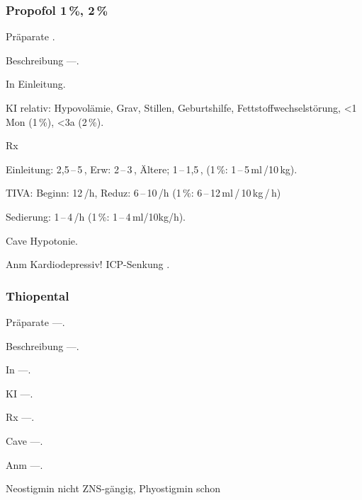 \subsubsection{Propofol 1\,\%, 2\,\%}

\begin{labeling}[:]{mm}
  \item[Präparate]  .
  \item[Beschreibung] ---.
  \item[In] Einleitung.
  \item[KI] relativ: Hypovolämie, Grav, Stillen, Geburtshilfe,
  Fettstoffwechselstörung, {\textless}1 Mon (1\,\%), {\textless}3a (2\,\%).
  \item[Rx]
  \begin{inparaitem}
  \item Einleitung: 2,5\,--\,5\,, Erw:
  2\,--\,3\,, Ältere; 1\,--\,1,5\,, (1\,\%:
  1\,--\,5\,ml\,/\.10\,kg).
  \item TIVA: Beginn: 12\,/h, Reduz:
  6\,--\,10\,/h (1\,\%: 6\,--\,12\,ml\,/\,10\,kg\,/\,h)
  \item Sedierung: 1\,--\,4\,/h (1\,\%: 1\,--\,4\,ml/10kg/h).
  \end{inparaitem}
  \item[Cave] Hypotonie.
  \item[Anm]  Kardiodepressiv! ICP-Senkung .
\end{labeling}

\subsubsection{Thiopental }

\begin{labeling}[:]{mm}
  \item[Präparate] ---.
  \item[Beschreibung] ---.
  \item[In] ---.
  \item[KI] ---.
  \item[Rx] ---.
  \item[Cave] ---.
  \item[Anm] ---.
\end{labeling}



{
Neostigmin nicht ZNS-gängig, Phyostigmin schon}





